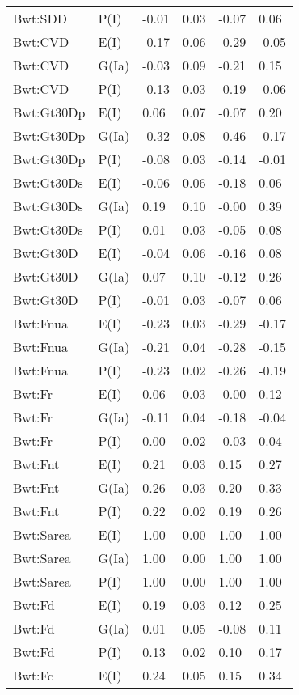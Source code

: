 \begin{center}
\begin{longtable}{|p{1.1in}|p{0.7in}|p{0.7in}|p{0.6in}|p{0.6in}|p{0.6in}|}
  Bwt:SDD & P(I) & -0.01 & 0.03 & -0.07 & 0.06 \\ 
  Bwt:CVD & E(I) & -0.17 & 0.06 & -0.29 & -0.05 \\ 
  Bwt:CVD & G(Ia) & -0.03 & 0.09 & -0.21 & 0.15 \\ 
  Bwt:CVD & P(I) & -0.13 & 0.03 & -0.19 & -0.06 \\ 
  Bwt:Gt30Dp & E(I) & 0.06 & 0.07 & -0.07 & 0.20 \\ 
  Bwt:Gt30Dp & G(Ia) & -0.32 & 0.08 & -0.46 & -0.17 \\ 
  Bwt:Gt30Dp & P(I) & -0.08 & 0.03 & -0.14 & -0.01 \\ 
  Bwt:Gt30Ds & E(I) & -0.06 & 0.06 & -0.18 & 0.06 \\ 
  Bwt:Gt30Ds & G(Ia) & 0.19 & 0.10 & -0.00 & 0.39 \\ 
  Bwt:Gt30Ds & P(I) & 0.01 & 0.03 & -0.05 & 0.08 \\ 
  Bwt:Gt30D & E(I) & -0.04 & 0.06 & -0.16 & 0.08 \\ 
  Bwt:Gt30D & G(Ia) & 0.07 & 0.10 & -0.12 & 0.26 \\ 
  Bwt:Gt30D & P(I) & -0.01 & 0.03 & -0.07 & 0.06 \\ 
  Bwt:Fnua & E(I) & -0.23 & 0.03 & -0.29 & -0.17 \\ 
  Bwt:Fnua & G(Ia) & -0.21 & 0.04 & -0.28 & -0.15 \\ 
  Bwt:Fnua & P(I) & -0.23 & 0.02 & -0.26 & -0.19 \\ 
  Bwt:Fr & E(I) & 0.06 & 0.03 & -0.00 & 0.12 \\ 
  Bwt:Fr & G(Ia) & -0.11 & 0.04 & -0.18 & -0.04 \\ 
  Bwt:Fr & P(I) & 0.00 & 0.02 & -0.03 & 0.04 \\ 
  Bwt:Fnt & E(I) & 0.21 & 0.03 & 0.15 & 0.27 \\ 
  Bwt:Fnt & G(Ia) & 0.26 & 0.03 & 0.20 & 0.33 \\ 
  Bwt:Fnt & P(I) & 0.22 & 0.02 & 0.19 & 0.26 \\ 
  Bwt:Sarea & E(I) & 1.00 & 0.00 & 1.00 & 1.00 \\ 
  Bwt:Sarea & G(Ia) & 1.00 & 0.00 & 1.00 & 1.00 \\ 
  Bwt:Sarea & P(I) & 1.00 & 0.00 & 1.00 & 1.00 \\ 
  Bwt:Fd & E(I) & 0.19 & 0.03 & 0.12 & 0.25 \\ 
  Bwt:Fd & G(Ia) & 0.01 & 0.05 & -0.08 & 0.11 \\ 
  Bwt:Fd & P(I) & 0.13 & 0.02 & 0.10 & 0.17 \\ 
  Bwt:Fc & E(I) & 0.24 & 0.05 & 0.15 & 0.34 \\ 

\end{longtable}
\end{center}

